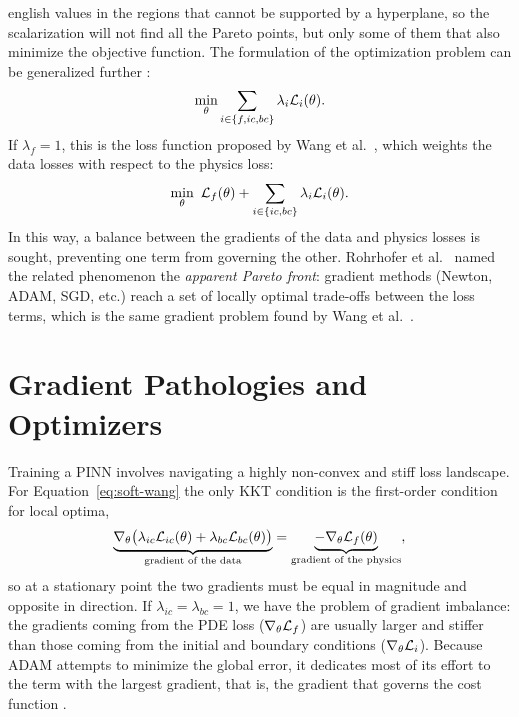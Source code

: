 \documentclass[0000.tex]{subfiles}
\begin{document}
\begin{hyphenrules}{english}
values in the regions that cannot be supported by a hyperplane, so the scalarization will not find all
the Pareto points, but only some of them that also minimize the objective function. The formulation of
the optimization problem can be generalized further \cite{rohrhofer2023}:
\begin{equation}
  \min_{\theta}\sum_{i\in\{f,ic,bc\}}\lambda_i\mathcal{L}_i(\theta).
  \label{eq:soft-general}
\end{equation}
If $\lambda_f=1$, this is the loss function proposed by Wang et al.~\cite{wang2021gradient}, which weights the
data losses with respect to the physics loss:
\begin{equation}
  \min_{\theta}\ \Loss_f(\theta)+\sum_{i\in\{ic,bc\}}\lambda_i\Loss_i(\theta).
  \label{eq:soft-wang}
\end{equation}
In this way, a balance between the gradients of the data and physics losses is sought, preventing one
term from governing the other. Rohrhofer et al.~\cite{rohrhofer2023} named the related phenomenon the \emph{apparent
Pareto front}: gradient methods (Newton, ADAM, SGD, etc.) reach a set of locally optimal trade-offs
between the loss terms, which is the same gradient problem found by Wang et al.~\cite{wang2021gradient}.

\section{Gradient Pathologies and Optimizers}\label{sec:gradient-pathologies}

Training a PINN involves navigating a highly non-convex and stiff loss landscape. For
Equation~\eqref{eq:soft-wang} the only KKT condition is the first-order condition for local optima,
\begin{equation}
  \underbrace{\nabla_\theta\big(\lambda_{ic}\mathcal{L}_{ic}(\theta)+\lambda_{bc}\mathcal{L}_{bc}(\theta)\big)}_{\text{gradient of the data}}
  =\underbrace{-\nabla_\theta\mathcal{L}_f(\theta)}_{\text{gradient of the physics}},
  \label{eq:kkt-soft}
\end{equation}
so at a stationary point the two gradients must be equal in magnitude and opposite in direction. If
$\lambda_{ic}=\lambda_{bc}=1$, we have the problem of gradient imbalance: the gradients coming from the
PDE loss ($\nabla_\theta\mathcal{L}_f$) are usually larger and stiffer than those coming from the initial and
boundary conditions ($\nabla_\theta\mathcal{L}_i$). Because ADAM attempts to minimize the global error, it
dedicates most of its effort to the term with the largest gradient, that is, the gradient that governs
the cost function \cite{wang2021gradient}.


\end{hyphenrules}
\end{document}
